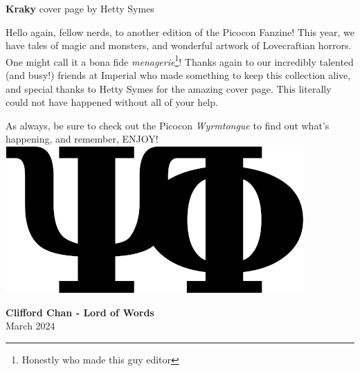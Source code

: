 \documentclass{picocon-fanzine}
\renewcommand{\tombstone}{%
  \includegraphics[height=\fontcharht\font`\B,clip]{img/tombstone}%
}
\begin{document}
\begin{center}
    \normalfont \textbf{Kraky} \textemdash{} cover page by Hetty Symes
\end{center}
\setcounter{page}{1}
\clearpage
{}
\setcounter{page}{1}
\noindent Hello again, fellow nerds, to another edition of the Picocon Fanzine! This year, we have tales of magic and monsters, and wonderful artwork of Lovecraftian horrors. One might call it a bona fide \textit{menagerie}\footnote{Honestly who made this guy editor}! Thanks again to our incredibly talented (and busy!) friends at Imperial who made something to keep this collection alive, and special thanks to Hetty Symes for the amazing cover page. This literally could not have happened without all of your help. 

As always, be sure to check out the Picocon \textit{Wyrmtongue} to find out what's happening, and remember, ENJOY!
\tombstone

\hfill \parbox{0.5\textwidth}{{\large\textbf{\textemdash{} Clifford Chan - Lord of Words}}\\\hspace*{1.7em}March 2024}
\vfill

\tableofcontents
\vfill
\clearpage



{}
\vfill
\clearpage

\vfill
\clearpage

\vfill
\clearpage

\vfill
\clearpage
\end{document}
